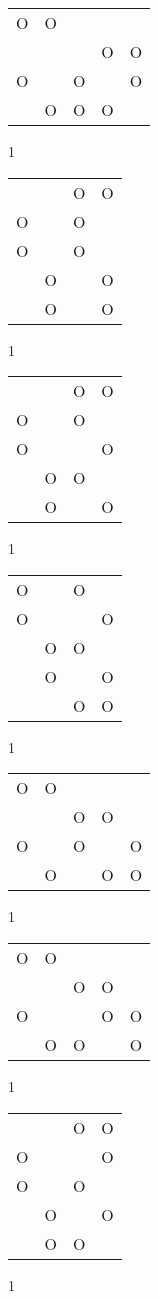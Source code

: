 \begin{tabular}{|m{0.2cm}m{0.2cm}m{0.2cm}m{0.2cm}m{0.2cm}|}\hline
O&O& & & \\
 & & &O&O\\
O& &O& &O\\
 &O&O&O& \\
\hline\end{tabular}1
\begin{tabular}{|m{0.2cm}m{0.2cm}m{0.2cm}m{0.2cm}|}\hline
 & &O&O\\
O& &O& \\
O& &O& \\
 &O& &O\\
 &O& &O\\
\hline\end{tabular}1
\begin{tabular}{|m{0.2cm}m{0.2cm}m{0.2cm}m{0.2cm}|}\hline
 & &O&O\\
O& &O& \\
O& & &O\\
 &O&O& \\
 &O& &O\\
\hline\end{tabular}1
\begin{tabular}{|m{0.2cm}m{0.2cm}m{0.2cm}m{0.2cm}|}\hline
O& &O& \\
O& & &O\\
 &O&O& \\
 &O& &O\\
 & &O&O\\
\hline\end{tabular}1
\begin{tabular}{|m{0.2cm}m{0.2cm}m{0.2cm}m{0.2cm}m{0.2cm}|}\hline
O&O& & & \\
 & &O&O& \\
O& &O& &O\\
 &O& &O&O\\
\hline\end{tabular}1
\begin{tabular}{|m{0.2cm}m{0.2cm}m{0.2cm}m{0.2cm}m{0.2cm}|}\hline
O&O& & & \\
 & &O&O& \\
O& & &O&O\\
 &O&O& &O\\
\hline\end{tabular}1
\begin{tabular}{|m{0.2cm}m{0.2cm}m{0.2cm}m{0.2cm}|}\hline
 & &O&O\\
O& & &O\\
O& &O& \\
 &O& &O\\
 &O&O& \\
\hline\end{tabular}1
